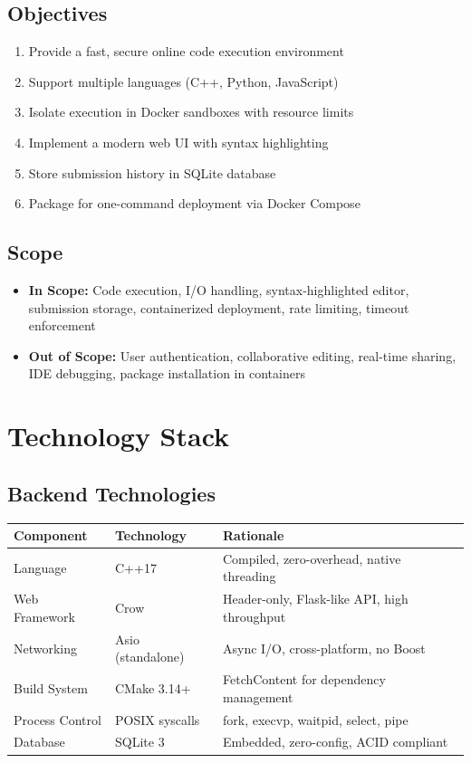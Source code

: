\documentclass[12pt,a4paper]{report}
\begin{document}
\section{Objectives}
\begin{enumerate}
    \item Provide a fast, secure online code execution environment
    \item Support multiple languages (C++, Python, JavaScript)
    \item Isolate execution in Docker sandboxes with resource limits
    \item Implement a modern web UI with syntax highlighting
    \item Store submission history in SQLite database
    \item Package for one-command deployment via Docker Compose
\end{enumerate}

\section{Scope}
\begin{itemize}
    \item \textbf{In Scope:} Code execution, I/O handling, syntax-highlighted editor, submission storage, containerized deployment, rate limiting, timeout enforcement
    \item \textbf{Out of Scope:} User authentication, collaborative editing, real-time sharing, IDE debugging, package installation in containers
\end{itemize}

\chapter{Technology Stack}

\section{Backend Technologies}
\begin{longtable}{@{}p{3.5cm}p{3.5cm}p{7cm}@{}}
\toprule
\textbf{Component} & \textbf{Technology} & \textbf{Rationale} \\
\midrule
Language & C++17 & Compiled, zero-overhead, native threading \\
Web Framework & Crow & Header-only, Flask-like API, high throughput \\
Networking & Asio (standalone) & Async I/O, cross-platform, no Boost \\
Build System & CMake 3.14+ & FetchContent for dependency management \\
Process Control & POSIX syscalls & fork, execvp, waitpid, select, pipe \\
Database & SQLite 3 & Embedded, zero-config, ACID compliant \\
\bottomrule
\end{longtable}
\end{document}
